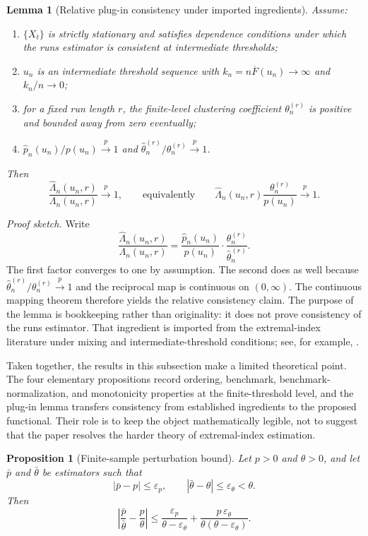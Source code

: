\documentclass[11pt]{article}
\newtheorem{proposition}{Proposition}
\newtheorem{lemma}{Lemma}
\begin{document}
\begin{lemma}[Relative plug-in consistency under imported ingredients]
Assume:
\begin{enumerate}[label=(A\arabic*),leftmargin=1.6em]
  \item $\{X_t\}$ is strictly stationary and satisfies dependence conditions under which the runs estimator is consistent at intermediate thresholds;
  \item $u_n$ is an intermediate threshold sequence with $k_n=n\overline{F}(u_n)\to\infty$ and $k_n/n\to 0$;
  \item for a fixed run length $r$, the finite-level clustering coefficient $\theta_n^{(r)}$ is positive and bounded away from zero eventually;
  \item $\widehat{p}_n(u_n)/p(u_n)\xrightarrow{p}1$ and $\widehat{\theta}_n^{(r)}/\theta_n^{(r)}\xrightarrow{p}1$.
\end{enumerate}
Then
\[
\frac{\widehat{\Lambda}_n(u_n,r)}{\Lambda_n(u_n,r)}\xrightarrow{p}1,
\qquad\text{equivalently}\qquad
\widehat{\Lambda}_n(u_n,r)\frac{\theta_n^{(r)}}{p(u_n)}\xrightarrow{p}1.
\]
\end{lemma}

\textit{Proof sketch.}
Write
\[
\frac{\widehat{\Lambda}_n(u_n,r)}{\Lambda_n(u_n,r)}
=
\frac{\widehat{p}_n(u_n)}{p(u_n)}
\cdot
\frac{\theta_n^{(r)}}{\widehat{\theta}_n^{(r)}}.
\]
The first factor converges to one by assumption. The second does as well because $\widehat{\theta}_n^{(r)}/\theta_n^{(r)}\xrightarrow{p}1$ and the reciprocal map is continuous on $(0,\infty)$. The continuous mapping theorem therefore yields the relative consistency claim. The purpose of the lemma is bookkeeping rather than originality: it does not prove consistency of the runs estimator. That ingredient is imported from the extremal-index literature under mixing and intermediate-threshold conditions; see, for example, \cite{ferro2003,suveges2007}.

Taken together, the results in this subsection make a limited theoretical point. The four elementary propositions record ordering, benchmark, benchmark-normalization, and monotonicity properties at the finite-threshold level, and the plug-in lemma transfers consistency from established ingredients to the proposed functional. Their role is to keep the object mathematically legible, not to suggest that the paper resolves the harder theory of extremal-index estimation.

\begin{proposition}[Finite-sample perturbation bound]
Let $p>0$ and $\theta>0$, and let $\bar{p}$ and $\bar{\theta}$ be estimators such that
\[
|\bar{p}-p|\le \varepsilon_p,
\qquad
|\bar{\theta}-\theta|\le \varepsilon_\theta<\theta.
\]
Then
\[
\left|\frac{\bar{p}}{\bar{\theta}}-\frac{p}{\theta}\right|
\le
\frac{\varepsilon_p}{\theta-\varepsilon_\theta}
+\frac{p\,\varepsilon_\theta}{\theta(\theta-\varepsilon_\theta)}.
\]
\end{proposition}
\end{document}
